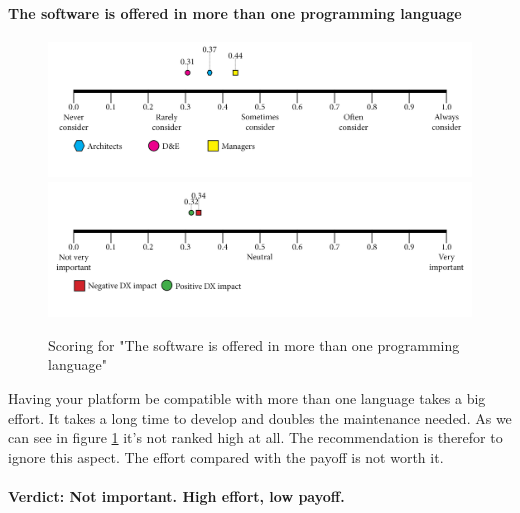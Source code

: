     \paragraph{The software is offered in more than one programming language}
    \begin{figure}[H]
        \centering
        \includegraphics[width=\linewidth]{scorelines/aspect13.png}
        \includegraphics[width=\linewidth]{dxscorelines/dxaspect13.png}
        \caption{Scoring for "The software is offered in more than one programming language"}
        \label{fig:aspect13}
    \end{figure}
    Having your platform be compatible with more than one language takes a big effort. It takes a long time to develop and doubles the maintenance needed. As we can see in figure \ref{fig:aspect13} it's not ranked high at all. The recommendation is therefor to ignore this aspect. The effort compared with the payoff is not worth it. \\ \\
    \textbf{Verdict: Not important. High effort, low payoff.}
    
